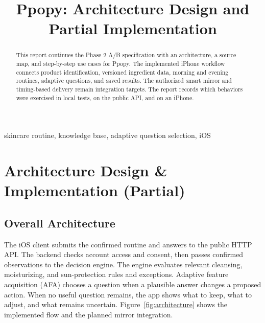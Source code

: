 \documentclass[conference,letterpaper]{IEEEtran}
\title{Ppopy: Architecture Design and Partial Implementation}
\author{\IEEEauthorblockN{Doyeong Koo, Takgeon Kang, Geonil Won}
\IEEEauthorblockA{Team CosMate, CSE 406 Software Engineering\\Hanyang University}}
\begin{document}
\maketitle
\begin{abstract}
This report continues the Phase 2 A/B specification with an architecture, a source map, and step-by-step use cases for Ppopy. The implemented iPhone workflow connects product identification, versioned ingredient data, morning and evening routines, adaptive questions, and saved results. The authorized smart mirror and timing-based delivery remain integration targets. The report records which behaviors were exercised in local tests, on the public API, and on an iPhone.
\end{abstract}
\begin{IEEEkeywords}
skincare routine, knowledge base, adaptive question selection, iOS
\end{IEEEkeywords}
\setcounter{section}{4}
\section{Architecture Design \& Implementation (Partial)}

\subsection{Overall Architecture}
The iOS client submits the confirmed routine and answers to the public HTTP API. The backend checks account access and consent, then passes confirmed observations to the decision engine. The engine evaluates relevant cleansing, moisturizing, and sun-protection rules and exceptions. Adaptive feature acquisition (AFA) chooses a question when a plausible answer changes a proposed action. When no useful question remains, the app shows what to keep, what to adjust, and what remains uncertain. Figure~\ref{fig:architecture} shows the implemented flow and the planned mirror integration.
\end{document}
